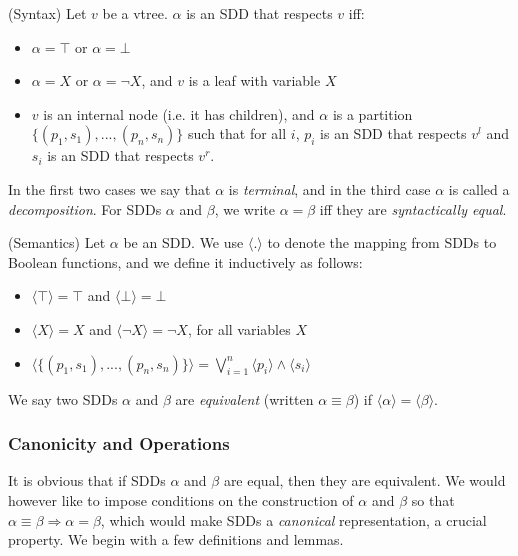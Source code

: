\documentclass[11pt]{article}
\newenvironment{definition}[1][Definition]{\begin{trivlist}
\item[\hskip \labelsep {\bfseries #1}]}{\end{trivlist}}
\begin{document}
\begin{definition} (Syntax) Let $v$ be a vtree. $\alpha$ is an SDD that respects $v$ iff: 
\begin{itemize} 
\item $\alpha = \top$ or $\alpha = \bot$
\item $\alpha = X$ or $\alpha = \lnot X$, and $v$ is a leaf with variable $X$
\item $v$ is an internal node (i.e. it has children), and $\alpha$ is a partition  $\{(p_1, s_1), ..., (p_n, s_n)\}$ such that for all $i$, $p_i$ is an SDD that respects $v^l$ and $s_i$ is an SDD that respects $v^r$.
\end{itemize}
In the first two cases we say that $\alpha$ is \textit{terminal}, and in the third case $\alpha$ is called a \textit{decomposition}. For SDDs $\alpha$ and $\beta$, we write $\alpha = \beta$ iff they are \textit{syntactically equal}.
\end{definition}

\begin{definition} (Semantics)
Let $\alpha$ be an SDD. We use $\langle . \rangle$ to denote the mapping from SDDs to Boolean functions, and we define it inductively as follows: 
\begin{itemize} 
\item $\langle \top \rangle = \top$ and  $\langle \bot \rangle = \bot$
\item $\langle X \rangle = X$ and $\langle \lnot X \rangle = \lnot X$, for all variables $X$
\item $\langle\{(p_1, s_1), ..., (p_n, s_n)\}\rangle = \bigvee_{i = 1}^n \langle p_i \rangle \land \langle s_i \rangle  $
\end{itemize}
We say two SDDs $\alpha$ and $\beta$ are \textit{equivalent} (written $\alpha \equiv \beta$) if $\langle \alpha \rangle = \langle \beta \rangle$.

\end{definition}

\subsubsection{Canonicity and Operations} 

It is obvious that if SDDs $\alpha$ and $\beta$ are equal, then they are equivalent. We would however like 
to impose conditions on the construction of $\alpha$ and $\beta$  so that $\alpha \equiv \beta \Rightarrow \alpha = \beta$, which would make SDDs a \textit{canonical }representation, a crucial property.
We begin with a few definitions and lemmas.
\end{document}
